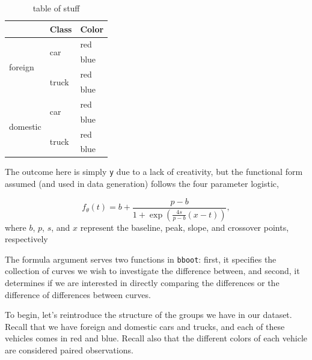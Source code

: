 \documentclass{article}
\newcommand{\xt}{\texttt}%
\begin{document}
\begin{table}[h]
\centering
\def\arraystretch{1.5}
\begin{tabular}{|p{0.9in}|p{0.9in}|p{0.9in}|} \hline 
\rowcolor{lightgray} \multicolumn{1}{|c|}{Origin} & \multicolumn{1}{c|}{Class} & \multicolumn{1}{c|}{Color}\\
\hline
\multirow{4}{*}{foreign} & \multirow{2}{*}{car} & red \\
\hhline{~~-}
& & blue \\
\hhline{~--}
& \multirow{2}{*}{truck} & red \\
\hhline{~~-}
& & blue \\
\hline
\multirow{4}{*}{domestic} & \multirow{2}{*}{car} & red \\
\hhline{~~-}
& & blue \\
\hhline{~--}
& \multirow{2}{*}{truck} & red \\
\hhline{~~-}
& & blue \\
\hline
\end{tabular}
\caption{table of stuff}
\label{tab:group_table1}
\end{table}

The outcome here is simply \xt{y} due to a lack of creativity, but the functional form assumed (and used in data generation) follows the four parameter logistic, 

\begin{equation}
f_{\theta}(t) = b + \frac{p-b}{1 + \exp \left( \frac{4s}{p-b} (x-t) \right)},
\end{equation}
where $b$, $p$, $s$, and $x$ represent the baseline, peak, slope, and crossover points, respectively



The formula argument serves two functions in \xt{bboot}: first, it specifies the collection of curves we wish to investigate the difference between, and second, it determines if we are interested in directly comparing the differences or the difference of differences between curves. 

To begin, let's reintroduce the structure of the groups we have in our dataset. Recall that we have foreign and domestic cars and trucks, and each of these vehicles comes in red and blue. Recall also that the different colors of each vehicle are considered paired observations.
\end{document}
